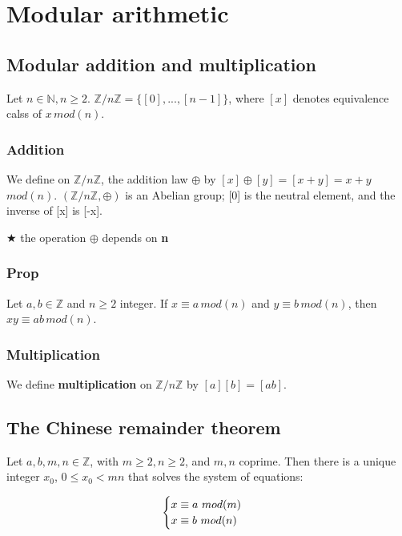 \section{Modular arithmetic}
        \subsection{Modular addition and multiplication}
            Let $n\in\mathbb{N}, n \geq 2$. $\mathbb{Z}/n\mathbb{Z} = \{ [0],...,[n-1]\}$, where $[x]$ denotes equivalence calss of $x\,mod(n)$.

            \subsubsection{Addition}
                We define on $\mathbb{Z}/n\mathbb{Z}$, the addition law $\oplus$ by $[x] \oplus [y] = [x+y] = x + y$ $mod(n)$. $(\mathbb{Z}/n\mathbb{Z}, \oplus)$ is an Abelian group; [0] is the neutral element, and the inverse of [x] is [-x].

                \vspace{5pt}
    
                $\bigstar$ the operation $\oplus$ depends on \textbf{n}
    
            \subsubsection{Prop}
                Let $a,b \in \mathbb{Z}$ and $n \geq 2$ integer. If $x \equiv a\,mod(n)$ and $y \equiv b\,mod(n)$, then $xy \equiv ab\,mod(n)$.
    
            \subsubsection{Multiplication}
                We define \textbf{multiplication} on $\mathbb{Z}/n\mathbb{Z}$ by $[a][b]=[ab]$.

        \subsection{The Chinese remainder theorem}
            Let $a,b,m,n \in \mathbb{Z}$, with $m \geq 2, n \geq 2$, and $m,n$ coprime. Then there is a unique integer $x_0$, $0\leq x_0<mn$ that solves the system of equations:

            \begin{equation}
                \begin{cases}
                    x \equiv a$ $mod(m) \\
                    x \equiv b$ $mod(n)
                \end{cases}
            \end{equation}

